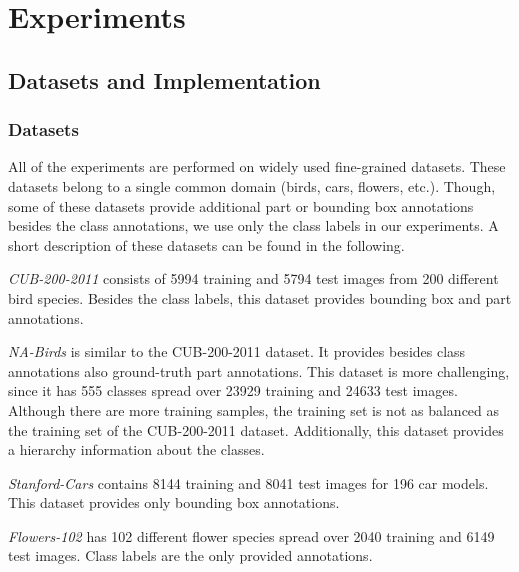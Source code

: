 \documentclass[runningheads]{llncs}
\begin{document}
 	\section{Experiments}
\label{sec:experiments}

\subsection{Datasets and Implementation}
\label{sub:datasets}
\subsubsection{Datasets}
All of the experiments are performed on widely used fine-grained datasets.
These datasets belong to a single common domain (birds, cars, flowers, etc.).
Though, some of these datasets provide additional part or bounding box annotations besides the class annotations, we use only the class labels in our experiments.
A short description of these datasets can be found in the following.

\emph{CUB-200-2011} \cite{CUB_200_2011} consists of \num{5994} training and \num{5794} test images from \num{200} different bird species.
Besides the class labels, this dataset provides bounding box and part annotations.

\emph{NA-Birds} \cite{NABirds} is similar to the CUB-200-2011 dataset.
It provides besides class annotations also ground-truth part annotations.
This dataset is more challenging, since it has \num{555} classes spread over \num{23929} training and \num{24633} test images.
Although there are more training samples, the training set is not as balanced as the training set of the CUB-200-2011 dataset.
Additionally, this dataset provides a hierarchy information about the classes.

\emph{Stanford-Cars} \cite{StanfordCars} contains \num{8144} training and \num{8041} test images for \num{196} car models.
This dataset provides only bounding box annotations.

\emph{Flowers-102} \cite{Flowers102} has \num{102} different flower species spread over \num{2040} training and \num{6149} test images. Class labels are the only provided annotations.
\end{document}
